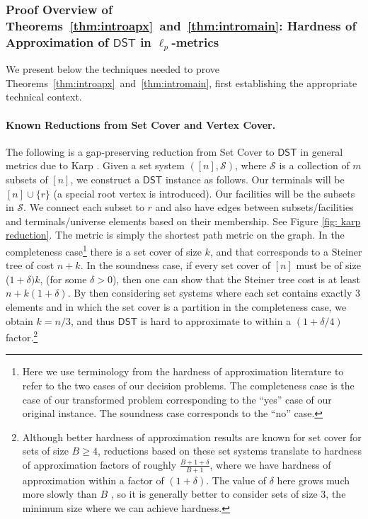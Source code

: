 \documentclass{article}\providecommand{\DeclareRedundantLanguages}[2]{}\usepackage[a4paper,margin=20mm]{geometry}
\newcommand{\1}{\textbf{1}}
\newcommand{\dst}{$\mathsf{DST}$\xspace}
\begin{document}
\subsubsection{\texorpdfstring{Proof Overview of Theorems~\ref{thm:introapx}~and~\ref{thm:intromain}: Hardness of Approximation of \dst in $\ell_p$-metrics}{Proof Overview of Theorems~\ref{thm:introapx}~and~\ref{thm:intromain}: Hardness of Approximation of DST in lp-metrics}}

We present below the techniques needed to prove Theorems~\ref{thm:introapx}~and~\ref{thm:intromain}, first establishing the appropriate technical context.
%
\paragraph{Known Reductions from Set Cover and Vertex Cover.} 
The following is a gap-preserving reduction from Set Cover to \dst in general metrics due to Karp \cite{karp1972reducibility}. 
Given a set system $([n],\mathcal{S})$, where $\mathcal{S}$ is a collection of $m$ subsets of $[n]$, we construct a \dst instance as follows. Our terminals will be $[n]\cup\{r\}$ (a special root vertex is introduced). Our facilities will be the subsets in $\mathcal{S}$. We connect each subset to $r$ and also have edges between subsets/facilities and terminals/universe elements based on their membership. See Figure \ref{fig: karp reduction}. The metric is simply the shortest path metric on the graph. In the completeness case\footnote{Here we use  terminology from the hardness of approximation literature to refer to the two cases of our decision problems. The completeness case is the case of our transformed problem corresponding to the ``yes'' case of our original instance. The soundness case corresponds to the ``no'' case.} there is a set cover of size $k$, and that corresponds to a Steiner tree of cost $n+k$. In the soundness case, if every set cover of $[n]$ must be of size ($1+\delta)k$, (for some $\delta>0$), then one can show that the Steiner tree cost is at least $n + k(1+\delta)$. By then considering set systems where each set contains exactly 3 elements and in which the set cover is a partition in the completeness case, we obtain $k=n/3$, and thus \dst is hard to approximate to within a  $(1+\delta/4)$ factor.\footnote{Although better hardness of approximation results are known for set cover for sets of size $B \geq 4$, reductions based on these set systems translate to hardness of approximation factors of roughly $\frac{B+ 1 + \delta}{B + 1}$, where we have hardness of approximation within a factor of $(1 + \delta)$. The value of $\delta$ here grows much more slowly than $B$ \cite{trevisan2001non}, so it is generally better to consider sets of size $3$, the minimum size where we can achieve hardness.}
\end{document}
